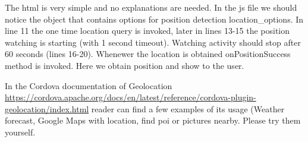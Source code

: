 

\begin{explain}
The html is very simple and no explanations are needed. In the js file we should notice the object that contains options for position detection location\_options. In line 11 the one time location query is invoked, later in lines 13-15 the position watching is starting (with 1 second timeout). Watching activity should stop after 60 seconds (lines 16-20). Whenewer the location is obtained onPositionSuccess method is invoked. Here we obtain position and show to the user.
\end{explain}    

\begin{extercises}
  In the Cordova documentation of Geolocation \url{https://cordova.apache.org/docs/en/latest/reference/cordova-plugin-geolocation/index.html} reader can find a few examples of its usage (Weather forecast, Google Maps with location, find poi or pictures nearby. Please try them yourself.
\end{extercises}